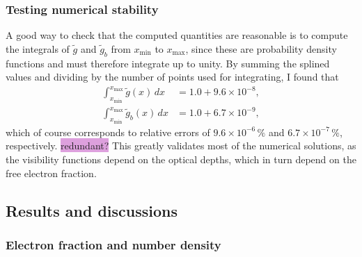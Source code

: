 \documentclass{aa}
\numberwithin{equation}{section}
\numberwithin{table}{section}
\numberwithin{figure}{section}
\begin{document}
\subsubsection{Testing numerical stability}
A good way to check that the computed quantities are reasonable is to compute the integrals of $\tilde{g}$ and $\tilde{g}_b$ from $x_\text{min}$ to $x_\text{max}$, since these are probability density functions and must therefore integrate up to unity. By summing the splined values and dividing by the number of points used for integrating, I found that
\begin{align*}
  \int_{x_\text{min}}^{x_\text{max}}\tilde{g}(x)\,dx &= 1.0+9.6\times10^{-8},
  \\
  \int_{x_\text{min}}^{x_\text{max}}\tilde{g}_b(x)\,dx &= 1.0+6.7\times10^{-9},
\end{align*}
which of course corresponds to relative errors of $9.6\times10^{-6}\,\%$ and $6.7\times10^{-7}\,\%$, respectively. \colorbox{Plum}{redundant?} This greatly validates most of the numerical solutions, as the visibility functions depend on the optical depths, which in turn depend on the free electron fraction.


\subsection{Results and discussions}\label{subsec: II results}




\subsubsection{Electron fraction and number density}
\end{document}
